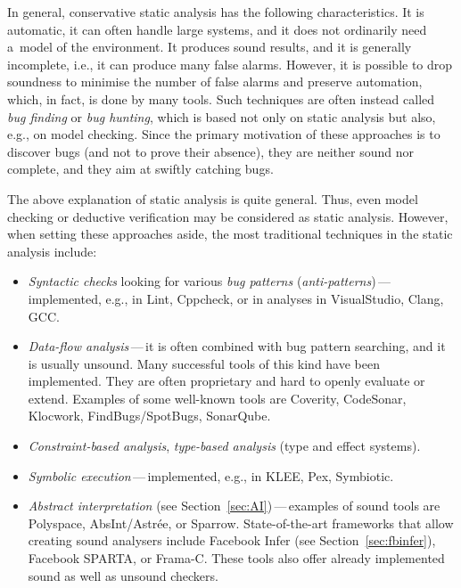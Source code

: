 In general, conservative static analysis has the following characteristics. It is automatic, it can often handle large systems, and it does not ordinarily need a~model of the environment. It produces sound results, and it is generally incomplete, i.e., it can produce many false alarms. However, it is possible to drop soundness to minimise the number of false alarms and preserve automation, which, in fact, is done by many tools. Such techniques are often instead called \emph{bug finding} or \emph{bug hunting}, which is based not only on static analysis but also, e.g., on model checking. Since the primary motivation of these approaches is to discover bugs (and not to prove their absence), they are neither sound nor complete, and they aim at swiftly catching bugs.

The above explanation of static analysis is quite general. Thus, even model checking or deductive verification may be considered as static analysis. However, when setting these approaches aside, the most traditional techniques in the static analysis include:
\begin{itemize}
    \item \emph{Syntactic checks} looking for various \emph{bug patterns} (\emph{anti-patterns})\,---\,implemented, e.g., in Lint, Cppcheck, or in analyses in VisualStudio, Clang, GCC.

    \item \emph{Data-flow analysis}\,---\,it is often combined with bug pattern searching, and it is usually unsound. Many successful tools of this kind have been implemented. They are often proprietary and hard to openly evaluate or extend. Examples of some well-known tools are Coverity, CodeSonar, Klocwork, FindBugs/SpotBugs, SonarQube.

    \item \emph{Constraint-based analysis}, \emph{type-based analysis} (type and effect systems).

    \item \emph{Symbolic execution}\,---\,implemented, e.g., in KLEE, Pex, Symbiotic.

    \item \emph{Abstract interpretation} (see Section~\ref{sec:AI})\,---\,examples of sound tools are Polyspace, AbsInt/Astrée, or Sparrow. State-of-the-art frameworks that allow creating sound analysers include Facebook Infer (see Section~\ref{sec:fbinfer}), Facebook SPARTA, or Frama-C. These tools also offer already implemented sound as well as unsound checkers.
\end{itemize}

